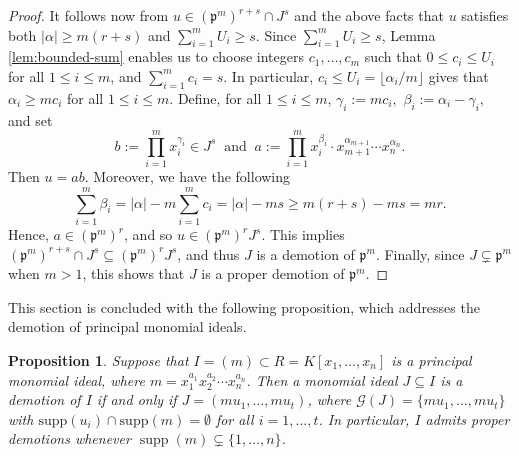 \documentclass[11pt]{amsart}
\newtheorem{proposition}[theorem]{Proposition}
\begin{document}
\begin{proof}
 It follows now from $u\in (\mathfrak{p}^m)^{r+s} \cap J^s$ and the above facts that  $u$ satisfies both $|\alpha| \ge m(r+s)$ and $\sum_{i=1}^m U_i \geq s.$ 
 Since $\sum_{i=1}^m U_i \ge s$,  Lemma \ref{lem:bounded-sum}  enables us to  choose  integers $c_1, \ldots, c_m$ such that  $0 \le c_i \le U_i$ 
  for all $1\leq i \leq m$,  and $\sum_{i=1}^m c_i = s$. 
 In particular,  $c_i \le U_i=\lfloor \alpha_i/m\rfloor$ gives that  $\alpha_i\geq mc_i$ for all $1\leq i \leq m$. 
Define,    for all $1\leq i \leq m$,  $\gamma_i := mc_i,$  $\beta_i := \alpha_i - \gamma_i,$ and set 
 $$b := \prod_{i=1}^m x_i^{\gamma_i} \in J^s  \;\; \text{and} \;\; a := \prod_{i=1}^m x_i^{\beta_i} \cdot x_{m+1}^{\alpha_{m+1}} \cdots x_n^{\alpha_n}.$$
 Then $u = ab$. Moreover, we have the following 
  $$\sum_{i=1}^m \beta_i = |\alpha| - m\sum_{i=1}^m c_i = |\alpha| - ms \ge m(r+s) - ms = mr.$$
 Hence,   $a \in ({\mathfrak{p}}^m)^r$, and so   $u \in ({\mathfrak{p}}^m)^r J^s$. This implies 
$(\mathfrak{p}^m)^{r+s} \cap J^s \subseteq (\mathfrak{p}^m)^r J^s$, and thus $J$ is a demotion of $\mathfrak{p}^m$.
   Finally, since $J \subsetneq {\mathfrak{p}}^m$ when $m > 1$, this shows that $J$ is a proper demotion of ${\mathfrak{p}}^m$. 
\end{proof}


This section is concluded with the following proposition, which addresses the demotion of principal monomial ideals. 
 
 \begin{proposition} \label{Demotion-2}
Suppose that  $I = (m) \subset R = K[x_1, \dots, x_n]$ is  a principal monomial ideal, where $m = x_1^{a_1} x_2^{a_2} \cdots x_n^{a_n}$.  
Then a monomial ideal $J \subseteq I$ is a \emph{demotion} of $I$ if and only if  $J= (m u_1, \dots, m u_t)$, where $\mathcal{G}(J)=\{mu_1, \dots, m u_t\}$
 with  $\mathrm{supp}(u_i)\cap \mathrm{supp}(m)=\emptyset$ for all $i=1, \ldots, t$.
  In particular, $I$ admits proper demotions whenever $\operatorname{supp}(m) \subsetneq \{1, \dots, n\}$.
\end{proposition}
\end{document}
